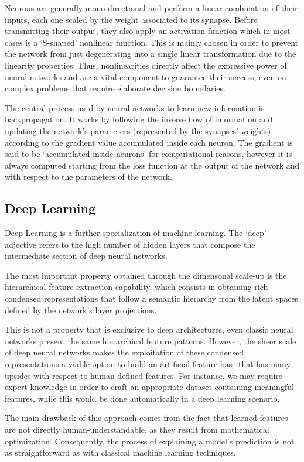 Neurons are generally mono-directional and perform a linear combination of their inputs, each one scaled by the weight associated to its synapse.
Before transmitting their output, they also apply an activation function which in most cases is a `S-shaped' nonlinear function.
This is mainly chosen in order to prevent the network from just degenerating into a single linear transformation due to the linearity properties.
Thus, nonlinearities directly affect the expressive power of neural networks and are a vital component to guarantee their success, even on complex problems that require elaborate decision boundaries.

The central process used by neural networks to learn new information is backpropagation.
It works by following the inverse flow of information and updating the network's parameters (represented by the synapses' weights) according to the gradient value accumulated inside each neuron.
The gradient is said to be `accumulated inside neurons' for computational reasons, however it is always computed starting from the loss function at the output of the network and with respect to the parameters of the network.

\subsection{Deep Learning}

Deep Learning is a further specialization of machine learning.
The `deep' adjective refers to the high number of hidden layers that compose the intermediate section of deep neural networks.

The most important property obtained through the dimensonal scale-up is the hierarchical feature extraction capability, which consists in obtaining rich condensed representations that follow a semantic hierarchy from the latent spaces defined by the network's layer projections.

This is not a property that is exclusive to deep architectures, even classic neural networks present the same hierarchical feature patterns.
However, the sheer scale of deep neural networks makes the exploitation of these condensed representations a viable option to build an artificial feature base that has many upsides with respect to human-defined features.
For instance, we may require expert knowledge in order to craft an appropriate dataset containing meaningful features, while this would be done automatically in a deep learning scenario.

The main drawback of this approach comes from the fact that learned features are not directly human-understandable, as they result from mathematical optimization.
Consequently, the process of explaining a model's prediction is not as straightforward as with classical machine learning techniques.


